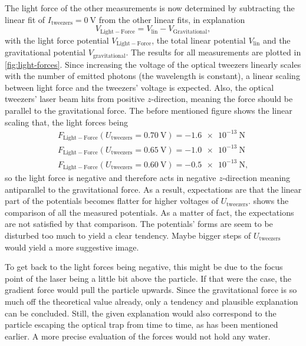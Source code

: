 \documentclass[../bericht.tex]{subfiles}
\begin{document}
      The light force of the other measurements is now determined by subtracting the linear fit of $I_\mathrm{tweezers}=\SI{0}{\volt}$ from the other linear fits, in explanation
      \begin{equation}
          V_\mathrm{Light-Force} = V_\mathrm{lin} - V_\mathrm{Gravitational},
          \label{eq:light-forces}
      \end{equation}
      with the light force potential $V_\mathrm{Light-Force}$, the total linear potential $V_\mathrm{lin}$ and the gravitational potential $V_\mathrm{gravitational}$. The results for all measurements are plotted in \cref{fig:light-forces}. Since increasing the voltage of the optical tweezers linearly scales with the number of emitted photons (the wavelength is constant), a linear scaling between light force and the tweezers' voltage is expected. Also, the optical tweezers' laser beam hits from positive $z$-direction, meaning the force should be parallel to the gravitational force. The before mentioned figure shows the linear scaling that, the light forces being
      \begin{align*}
        F_\mathrm{Light-Force}(U_\mathrm{tweezers}=\SI{0,70}{\volt})=\SI{-1,6e-13}{\newton} \\
        F_\mathrm{Light-Force}(U_\mathrm{tweezers}=\SI{0,65}{\volt})=\SI{-1,0e-13}{\newton} \\
        F_\mathrm{Light-Force}(U_\mathrm{tweezers}=\SI{0,60}{\volt})=\SI{-0,5e-13}{\newton} ,
      \end{align*}
      so the light force is negative and therefore acts in negative $z$-direction meaning antiparallel to the gravitational force. As a result, expectations are that the linear part of the potentials becomes flatter for higher voltages of $U_\mathrm{tweezers}$.  shows the comparison of all the measured potentials. As a matter of fact, the expectations are not satisfied by that comparison. The potentials' forms are seem to be disturbed too much to yield a clear tendency. Maybe bigger steps of $U_\mathrm{tweezers}$ would yield a more suggestive image.

      To get back to the light forces being negative, this might be due to the focus point of the laser being a little bit above the particle. If that were the case, the gradient force would pull the particle upwards. Since the gravitational force is so much off the theoretical value already, only a tendency and plausible explanation can be concluded. Still, the given explanation would also correspond to the particle escaping the optical trap from time to time, as has been mentioned earlier. A more precise evaluation of the forces would not hold any water.
      \medskip
\end{document}
